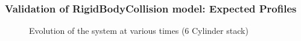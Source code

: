\documentclass{beamer}
\begin{document}
 \begin{frame} %
  \frametitle{Validation of RigidBodyCollision model: Expected Profiles} 
  	  \begin{figure}
 	   \caption{Evolution of the system at various times (6 Cylinder stack)}
 	   \end{figure}
  \end{frame}
 
\end{document}
